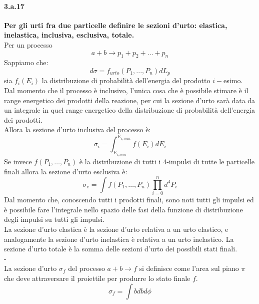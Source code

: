 \documentclass[twoside]{article}
\begin{document}
\paragraph{3.a.17}\textbf{Per gli urti fra due particelle definire le sezioni d'urto: elastica, inelastica, inclusiva, esclusiva, totale.}\\
Per un processo 
\begin{equation}
    a+b\longrightarrow p_1+p_2+\dots+p_n
\end{equation}
Sappiamo che:
\begin{equation}
    d\sigma=f_{urto}(P_1,...,P_n)dL_p
\end{equation}
sia $f_i(E_i)$ la distribuzione di probabilità dell'energia del prodotto $i-$esimo. 
\\
Dal momento che il processo è inclusivo, l'unica cosa che è possibile stimare è il range energetico dei prodotti della reazione, per cui la sezione d'urto sarà data da un integrale in quel range energetico della distribuzione di probabilità dell'energia dei prodotti.
\\
Allora la sezione d'urto inclusiva del processo è:
\begin{equation}
    \sigma_i=\int_{E_{i,min}}^{E_{i,max}}f(E_i)dE_i
\end{equation}
Se invece $f(P_1,\dots,P_n)$ è la distribuzione di tutti i 4-impulsi di tutte le particelle finali allora la sezione d'urto esclusiva è:
\begin{equation}
    \sigma_e=\int f(P_1,\dots, P_n)\prod_{i=0}^nd^4P_i
\end{equation}
Dal momento che, conoscendo tutti i prodotti finali, sono noti tutti gli impulsi ed è possibile fare l'integrale nello spazio delle fasi della funzione di distribuzione degli impulsi su tutti gli impulsi.
\\
La sezione d'urto elastica è la sezione d'urto relativa a un urto elastico, e analogamente la sezione d'urto inelastica è relativa a un urto inelastico. La sezione d'urto totale è la somma delle sezioni d'urto dei possibili stati finali.\\
-\\
La sezione d'urto $\sigma_f$ del processo $a+b\rightarrow f$ si definisce come l'area sul piano $\pi$ che deve attraversare il proiettile per produrre lo stato finale $f$.\\
\begin{equation}
    \sigma_f=\int b db d\phi
\end{equation}
\end{document}
